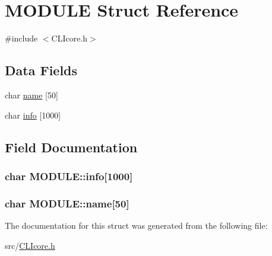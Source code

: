 \hypertarget{structMODULE}{}\section{M\+O\+D\+U\+L\+E Struct Reference}
\label{structMODULE}


{\ttfamily \#include $<$C\+L\+Icore.\+h$>$}

\subsection*{Data Fields}
\begin{DoxyCompactItemize}
\item 
char \hyperlink{structMODULE_adecbd02b92ae79ddaaff7be512380dea}{name} \mbox{[}50\mbox{]}
\item 
char \hyperlink{structMODULE_a8e21f2da9fe77d9781fc77e712d9e40c}{info} \mbox{[}1000\mbox{]}
\end{DoxyCompactItemize}


\subsection{Field Documentation}
\hypertarget{structMODULE_a8e21f2da9fe77d9781fc77e712d9e40c}{}
\subsubsection[{info}]{\setlength{\rightskip}{0pt plus 5cm}char M\+O\+D\+U\+L\+E\+::info\mbox{[}1000\mbox{]}}\label{structMODULE_a8e21f2da9fe77d9781fc77e712d9e40c}
\hypertarget{structMODULE_adecbd02b92ae79ddaaff7be512380dea}{}
\subsubsection[{name}]{\setlength{\rightskip}{0pt plus 5cm}char M\+O\+D\+U\+L\+E\+::name\mbox{[}50\mbox{]}}\label{structMODULE_adecbd02b92ae79ddaaff7be512380dea}


The documentation for this struct was generated from the following file\+:\begin{DoxyCompactItemize}
\item 
src/\hyperlink{CLIcore_8h}{C\+L\+Icore.\+h}\end{DoxyCompactItemize}
